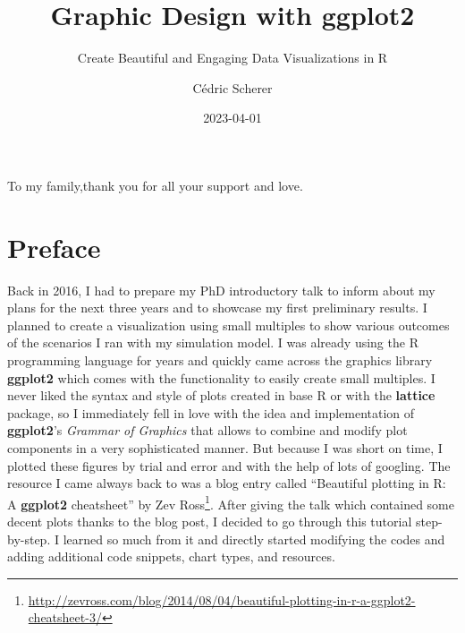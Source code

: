 \documentclass[
]{krantz}
\title{Graphic Design with ggplot2}
\subtitle{Create Beautiful and Engaging Data Visualizations in R}
\author{Cédric Scherer}
\date{2023-04-01}
\renewcommand{\href}[2]{#2\footnote{\url{#1}}}
\begin{document}
\maketitle


\thispagestyle{empty}

\begin{center}
To my family,thank you for all your support and love.
\end{center}

\setlength{\abovedisplayskip}{-5pt}
\setlength{\abovedisplayshortskip}{-5pt}

{
\hypersetup{linkcolor=}
\setcounter{tocdepth}{2}
\tableofcontents
}
\listoffigures
\listoftables
\hypertarget{preface}{%
\chapter*{Preface}\label{preface}}


Back in 2016, I had to prepare my PhD introductory talk to inform about my plans for the next three years and to showcase my first preliminary results. I planned to create a visualization using small multiples to show various outcomes of the scenarios I ran with my simulation model. I was already using the R programming language for years and quickly came across the graphics library \textbf{ggplot2} which comes with the functionality to easily create small multiples. I never liked the syntax and style of plots created in base R or with the \textbf{lattice} package, so I immediately fell in love with the idea and implementation of \textbf{ggplot2}'s \emph{Grammar of Graphics} that allows to combine and modify plot components in a very sophisticated manner. But because I was short on time, I plotted these figures by trial and error and with the help of lots of googling. The resource I came always back to was a blog entry called \href{http://zevross.com/blog/2014/08/04/beautiful-plotting-in-r-a-ggplot2-cheatsheet-3/}{``Beautiful plotting in R: A \textbf{ggplot2} cheatsheet'' by Zev Ross}. After giving the talk which contained some decent plots thanks to the blog post, I decided to go through this tutorial step-by-step. I learned so much from it and directly started modifying the codes and adding additional code snippets, chart types, and resources.
\end{document}
